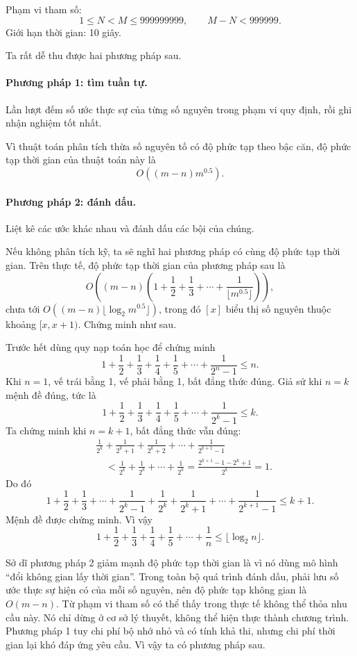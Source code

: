 \documentclass[11pt]{article}
\begin{document}
Phạm vi tham số:
\[
1\le N<M\le999999999,\qquad M-N<999999.
\]
Giới hạn thời gian: 10 giây.

Ta rất dễ thu được hai phương pháp sau.

\paragraph{Phương pháp 1: tìm tuần tự.}
Lần lượt đếm số ước thực sự của từng số nguyên trong phạm vi quy định, rồi
ghi nhận nghiệm tốt nhất.

Vì thuật toán phân tích thừa số nguyên tố có độ phức tạp theo bậc căn, độ
phức tạp thời gian của thuật toán này là
\[
O((m-n)m^{0.5}).
\]

\paragraph{Phương pháp 2: đánh dấu.}
Liệt kê các ước khác nhau và đánh dấu các bội của chúng.

Nếu không phân tích kỹ, ta sẽ nghĩ hai phương pháp có cùng độ phức tạp thời
gian. Trên thực tế, độ phức tạp thời gian của phương pháp sau là
\[
O\!\left((m-n)\left(1+\frac12+\frac13+\cdots+\frac1{\lfloor m^{0.5}\rfloor}\right)\right),
\]
chưa tới \(O((m-n)\lfloor\log_2 m^{0.5}\rfloor)\), trong đó \([x]\) biểu thị
số nguyên thuộc khoảng \([x,x+1)\). Chứng minh như sau.

Trước hết dùng quy nạp toán học để chứng minh
\[
1+\frac12+\frac13+\frac14+\frac15+\cdots+\frac1{2^n-1}\le n.
\]
Khi \(n=1\), vế trái bằng 1, vế phải bằng 1, bất đẳng thức đúng. Giả sử khi
\(n=k\) mệnh đề đúng, tức là
\[
1+\frac12+\frac13+\frac14+\frac15+\cdots+\frac1{2^k-1}\le k.
\]
Ta chứng minh khi \(n=k+1\), bất đẳng thức vẫn đúng:
\[
\begin{aligned}
&\frac1{2^k}+\frac1{2^k+1}+\frac1{2^k+2}+\cdots+\frac1{2^{k+1}-1}\\
&\quad < \frac1{2^k}+\frac1{2^k}+\cdots+\frac1{2^k}
       = \frac{2^{k+1}-1-2^k+1}{2^k}=1.
\end{aligned}
\]
Do đó
\[
1+\frac12+\frac13+\cdots+\frac1{2^k-1}
 +\frac1{2^k}+\frac1{2^k+1}+\cdots+\frac1{2^{k+1}-1}\le k+1.
\]
Mệnh đề được chứng minh. Vì vậy
\[
1+\frac12+\frac13+\frac14+\frac15+\cdots+\frac1n\le\lfloor\log_2 n\rfloor.
\]

Sở dĩ phương pháp 2 giảm mạnh độ phức tạp thời gian là vì nó dùng mô hình
``đổi không gian lấy thời gian''. Trong toàn bộ quá trình đánh dấu, phải lưu
số ước thực sự hiện có của mỗi số nguyên, nên độ phức tạp không gian là
\(O(m-n)\). Từ phạm vi tham số có thể thấy trong thực tế không thể thỏa nhu
cầu này. Nó chỉ dừng ở cơ sở lý thuyết, không thể hiện thực thành chương
trình. Phương pháp 1 tuy chi phí bộ nhớ nhỏ và có tính khả thi, nhưng chi phí
thời gian lại khó đáp ứng yêu cầu. Vì vậy ta có phương pháp sau.
\end{document}
